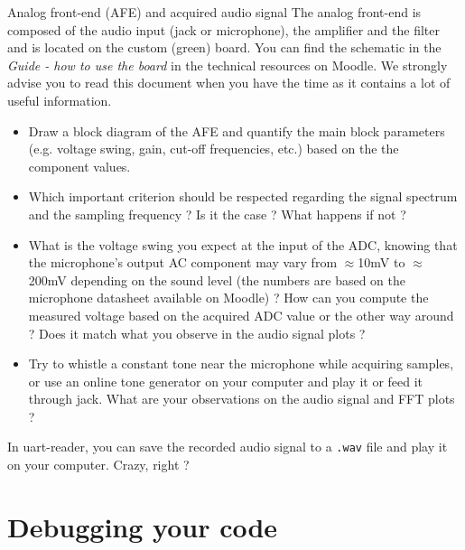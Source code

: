\begin{bclogo}[couleur = gray!20, arrondi = 0.2, logo=\bcquestion]{Analog front-end (AFE) and acquired audio signal}
The analog front-end is composed of the audio input (jack or microphone), the amplifier and the filter and is located on the custom (green) board. You can find the schematic in the \textit{Guide - how to use the board} in the technical resources on Moodle. We strongly advise you to read this document when you have the time as it contains a lot of useful information.
\begin{itemize}
    \item Draw a block diagram of the AFE and quantify the main block parameters (e.g. voltage swing, gain, cut-off frequencies, etc.) based on the the component values.
    \item Which important criterion should be respected regarding the signal spectrum and the sampling frequency ? Is it the case ? What happens if not ?
    \item What is the voltage swing you expect at the input of the ADC, knowing that the microphone's output AC component may vary from $\approx$10mV to $\approx$200mV depending on the sound level (the numbers are based on the microphone datasheet available on Moodle) ? How can you compute the measured voltage based on the acquired ADC value or the other way around ? Does it match what you observe in the audio signal plots ?
    \item Try to whistle a constant tone near the microphone while acquiring samples, or use an online tone generator on your computer and play it or feed it through jack. What are your observations on the audio signal and FFT plots ?
\end{itemize}
In uart-reader, you can save the recorded audio signal to a \texttt{.wav} file and play it on your computer. Crazy, right ?
\end{bclogo}

\newpage

\section{Debugging your code}

